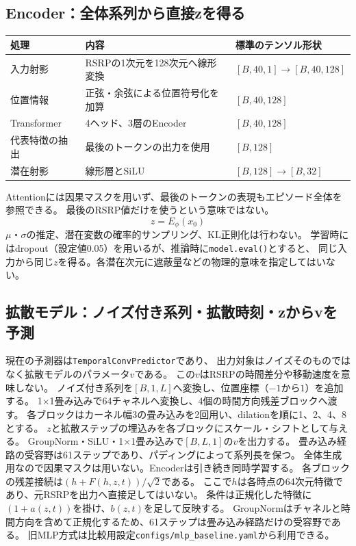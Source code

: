 \documentclass[a4paper,10pt]{article}
\begin{document}
\subsection{Encoder：全体系列から直接zを得る}
\begin{center}\small
\begin{tabularx}{\linewidth}{@{}lYY@{}}\toprule
処理 & 内容 & 標準のテンソル形状\\\midrule
入力射影 & RSRPの1次元を128次元へ線形変換 & $[B,40,1]\to[B,40,128]$\\
位置情報 & 正弦・余弦による位置符号化を加算 & $[B,40,128]$\\
Transformer & 4ヘッド、3層のEncoder & $[B,40,128]$\\
代表特徴の抽出 & 最後のトークンの出力を使用 & $[B,128]$\\
潜在射影 & 線形層とSiLU & $[B,128]\to[B,32]$\\\bottomrule
\end{tabularx}\end{center}
Attentionには因果マスクを用いず、最後のトークンの表現もエピソード全体を参照できる。
最後のRSRP値だけを使うという意味ではない。
\[
 \boxed{z=E_\phi(x_0)}
\]
$\mu$・$\sigma$の推定、潜在変数の確率的サンプリング、KL正則化は行わない。
学習時にはdropout（設定値0.05）を用いるが、推論時に\texttt{model.eval()}とすると、
同じ入力から同じ$z$を得る。各潜在次元に遮蔽量などの物理的意味を指定してはいない。

\subsection{拡散モデル：ノイズ付き系列・拡散時刻・zからvを予測}
現在の予測器は\texttt{TemporalConvPredictor}であり、
出力対象はノイズそのものではなく拡散モデルのパラメータ$v$である。
この$v$はRSRPの時間差分や移動速度を意味しない。
ノイズ付き系列を$[B,1,L]$へ変換し、位置座標（$-1$から$1$）を追加する。
1$\times$1畳み込みで64チャネルへ変換し、4個の時間方向残差ブロックへ渡す。
各ブロックはカーネル幅3の畳み込みを2回用い、dilationを順に1、2、4、8とする。
$z$と拡散ステップの埋込みを各ブロックにスケール・シフトとして与える。
GroupNorm・SiLU・1$\times$1畳み込みで$[B,L,1]$の$v$を出力する。
畳み込み経路の受容野は61ステップであり、パディングによって系列長を保つ。
全体生成用なので因果マスクは用いない。Encoderは引き続き同時学習する。
各ブロックの残差接続は$(h+F(h,z,t))/\sqrt{2}$である。
ここで$h$は各時点の64次元特徴であり、元RSRPを出力へ直接足してはいない。
条件は正規化した特徴に$(1+a(z,t))$を掛け、$b(z,t)$を足して反映する。
GroupNormはチャネルと時間方向を含めて正規化するため、61ステップは畳み込み経路だけの受容野である。
旧MLP方式は比較用設定\texttt{configs/mlp\_baseline.yaml}から利用できる。
\end{document}
